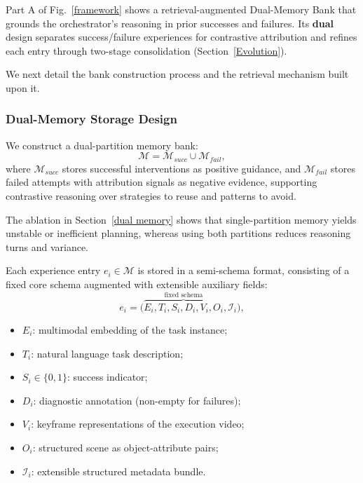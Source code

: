 Part A of Fig.~\ref{framework} shows a retrieval-augmented Dual-Memory Bank that grounds the {\color{black}orchestrator's reasoning} in prior successes and failures.
Its \textbf{dual} design separates success/failure experiences for contrastive attribution and refines each entry through two-stage consolidation (Section~\ref{Evolution}).

We next detail the bank construction process and the retrieval mechanism built upon it.

\subsubsection{Dual-Memory Storage Design}

We construct a dual-partition memory bank:
\begin{equation}
\mathcal{M} = \mathcal{M}_{succ} \cup \mathcal{M}_{fail},
\end{equation}
where $\mathcal{M}_{succ}$ stores successful interventions as positive guidance, and $\mathcal{M}_{fail}$ stores failed attempts with attribution signals as negative evidence, supporting contrastive reasoning over strategies to reuse and patterns to avoid.

The ablation in Section~\ref{dual memory} shows that single-partition memory yields unstable or inefficient planning, whereas using both partitions reduces reasoning turns and variance.

Each experience entry $e_i \in \mathcal{M}$ is stored in a semi-schema format, consisting of a fixed core schema augmented with extensible auxiliary fields:
\vspace{-0.5em}
\begin{equation}
e_i = \big(
\overbrace{E_i, T_i, S_i, D_i, V_i, O_i}^{\text{fixed schema}}, 
\mathcal{I}_i
\big),
\end{equation}
\begin{itemize}
    \item $E_i$: {\color{black}multimodal} embedding of the task instance;
    \item $T_i$: natural language task description;
    \item $S_i \in \{0,1\}$: success indicator;
    \item $D_i$: diagnostic annotation (non-empty for failures);
    \item $V_i$: keyframe representations of the execution video;
    \item $O_i$: structured scene as object-attribute pairs;
    \item $\mathcal{I}_i$: extensible structured metadata bundle.
\end{itemize}


